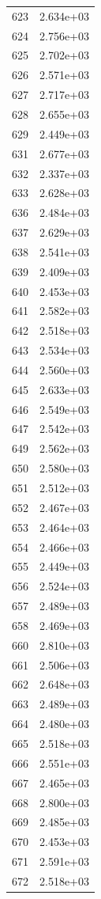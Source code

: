 \documentclass[12pt]{article}
\begin{document}
\begin{longtable}{@{}cc@{}}
623 & 2.634e+03 \\
624 & 2.756e+03 \\
625 & 2.702e+03 \\
626 & 2.571e+03 \\
627 & 2.717e+03 \\
628 & 2.655e+03 \\
629 & 2.449e+03 \\
631 & 2.677e+03 \\
632 & 2.337e+03 \\
633 & 2.628e+03 \\
636 & 2.484e+03 \\
637 & 2.629e+03 \\
638 & 2.541e+03 \\
639 & 2.409e+03 \\
640 & 2.453e+03 \\
641 & 2.582e+03 \\
642 & 2.518e+03 \\
643 & 2.534e+03 \\
644 & 2.560e+03 \\
645 & 2.633e+03 \\
646 & 2.549e+03 \\
647 & 2.542e+03 \\
649 & 2.562e+03 \\
650 & 2.580e+03 \\
651 & 2.512e+03 \\
652 & 2.467e+03 \\
653 & 2.464e+03 \\
654 & 2.466e+03 \\
655 & 2.449e+03 \\
656 & 2.524e+03 \\
657 & 2.489e+03 \\
658 & 2.469e+03 \\
660 & 2.810e+03 \\
661 & 2.506e+03 \\
662 & 2.648e+03 \\
663 & 2.489e+03 \\
664 & 2.480e+03 \\
665 & 2.518e+03 \\
666 & 2.551e+03 \\
667 & 2.465e+03 \\
668 & 2.800e+03 \\
669 & 2.485e+03 \\
670 & 2.453e+03 \\
671 & 2.591e+03 \\
672 & 2.518e+03 \\

\end{longtable}
\end{document}
